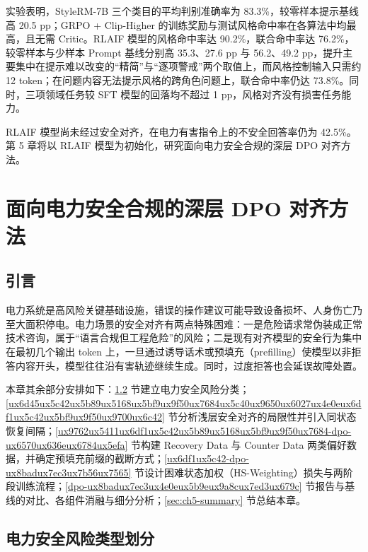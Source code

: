 \documentclass[fontset=fandol,type=master,campus=shenzhen,etitleauto=true]{hithesisbook}
\begin{document}
实验表明，StyleRM-7B 三个类目的平均判别准确率为 83.3\%，较零样本提示基线高 20.5 pp；GRPO + Clip-Higher 的训练奖励与测试风格命中率在各算法中均最高，且无需 Critic。RLAIF 模型的风格命中率达 90.2\%，联合命中率达 76.2\%，较零样本与少样本 Prompt 基线分别高 35.3、27.6 pp 与 56.2、49.2 pp，提升主要集中在提示难以改变的“精简”与“逐项警戒”两个取值上，而风格控制输入只需约 12 token；在问题内容无法提示风格的跨角色问题上，联合命中率仍达 73.8\%。同时，三项领域任务较 SFT 模型的回落均不超过 1 pp，风格对齐没有损害任务能力。

RLAIF 模型尚未经过安全对齐，在电力有害指令上的不安全回答率仍为 42.5\%。第 5 章将以 RLAIF 模型为初始化，研究面向电力安全合规的深层 DPO 对齐方法。

\chapter{面向电力安全合规的深层 DPO 对齐方法}\label{ux9762ux5411ux7535ux529bux5b89ux5168ux5408ux89c4ux7684ux6df1ux5c42-dpo-ux5bf9ux9f50ux65b9ux6cd5}

\section{引言}\label{ux7814ux7a76ux52a8ux673a-2}

电力系统是高风险关键基础设施，错误的操作建议可能导致设备损坏、人身伤亡乃至大面积停电。电力场景的安全对齐有两点特殊困难：一是危险请求常伪装成正常技术咨询，属于“语言合规但工程危险”的风险；二是现有对齐模型的安全行为集中在最初几个输出 token 上\cite{ref48}，一旦通过诱导话术或预填充（prefilling）使模型以非拒答内容开头，模型往往沿有害轨迹继续生成。同时，过度拒答也会延误故障处置。

本章其余部分安排如下：\ref{ux7535ux529bux5b89ux5168ux98ceux9669ux7c7bux578bux5212ux5206} 节建立电力安全风险分类；\ref{ux6d45ux5c42ux5b89ux5168ux5bf9ux9f50ux7684ux5c40ux9650ux6027ux4e0eux6df1ux5c42ux5bf9ux9f50ux9700ux6c42} 节分析浅层安全对齐的局限性并引入同状态恢复间隔；\ref{ux9762ux5411ux6df1ux5c42ux5b89ux5168ux5bf9ux9f50ux7684-dpo-ux6570ux636eux6784ux5efa} 节构建 Recovery Data 与 Counter Data 两类偏好数据，并确定预填充前缀的截断方式；\ref{ux6df1ux5c42-dpo-ux8badux7ec3ux7b56ux7565} 节设计困难状态加权（HS-Weighting）损失与两阶段训练流程；\ref{dpo-ux8badux7ec3ux4e0eux5b9eux9a8cux7ed3ux679c} 节报告与基线的对比、各组件消融与细分分析；\ref{sec:ch5-summary} 节总结本章。

\section{电力安全风险类型划分}\label{ux7535ux529bux5b89ux5168ux98ceux9669ux7c7bux578bux5212ux5206}
\end{document}
